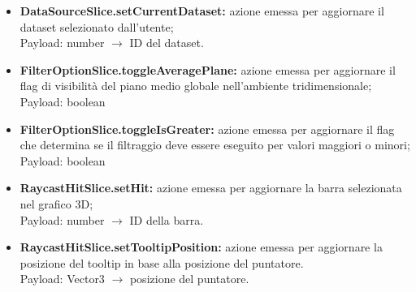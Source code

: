 \begin{itemize}
        \item \textbf{DataSourceSlice.setCurrentDataset:} azione emessa per aggiornare il dataset selezionato dall'utente; \\ Payload: number $\rightarrow$ ID del dataset.
        \item \textbf{FilterOptionSlice.toggleAveragePlane:} azione emessa per aggiornare il flag di visibilità del piano medio globale nell'ambiente tridimensionale; \\ Payload: boolean 
        \item \textbf{FilterOptionSlice.toggleIsGreater:} azione emessa per aggiornare il flag che determina se il filtraggio deve essere eseguito per valori maggiori o minori; \\ Payload: boolean
        \item \textbf{RaycastHitSlice.setHit:} azione emessa per aggiornare la barra selezionata nel grafico 3D; \\ Payload: number $\rightarrow$ ID della barra.
        \item \textbf{RaycastHitSlice.setTooltipPosition:} azione emessa per aggiornare la posizione del tooltip in base alla posizione del puntatore.\\ Payload: Vector3 $\rightarrow$ posizione del puntatore.
    \end{itemize}
